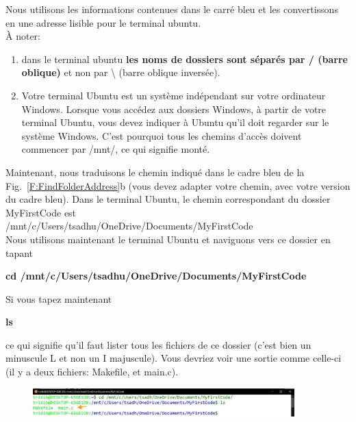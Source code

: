 \documentclass{article}
\newcommand\subfig[2]{{Fig.~\ref{#1}{#2}}}
\begin{document}
Nous utilisons les informations contenues dans le carré bleu et les convertissons en une adresse lisible pour le terminal ubuntu. \\
À noter:
\begin{enumerate}
\item dans le terminal ubuntu \textbf{les noms de dossiers sont séparés par / {\color{Bittersweet}(barre oblique)}} et non par \textbackslash{} (barre oblique inversée).
\item Votre terminal Ubuntu est un système indépendant sur votre ordinateur Windows. Lorsque vous accédez aux dossiers Windows, à partir de votre terminal Ubuntu, vous devez indiquer à Ubuntu qu'il doit regarder sur le système Windows. C'est pourquoi tous les chemins d'accès doivent commencer par /mnt/, ce qui signifie monté.
\end{enumerate}
Maintenant, nous traduisons le chemin indiqué dans le cadre bleu de la \subfig{F:FindFolderAddress}{b} (vous devez adapter votre chemin, avec votre version du cadre bleu). Dans le terminal Ubuntu, le chemin correspondant du dossier MyFirstCode est\\
/mnt/c/Users/tsadhu/OneDrive/Documents/MyFirstCode\\

Nous utilisons maintenant le terminal Ubuntu et naviguons vers ce dossier en tapant
\begin{tcolorbox}[width=\textwidth,colframe=BurntOrange,colback={black},title={ubuntu terminal},outer arc=0mm,colupper=white]  
    \large\textbf{  cd /mnt/c/Users/tsadhu/OneDrive/Documents/MyFirstCode }
\end{tcolorbox}
Si vous tapez maintenant 
\begin{tcolorbox}[width=\textwidth,colframe=BurntOrange,colback={black},title={ubuntu terminal},outer arc=0mm,colupper=white] 
      \large\textbf{ ls }
\end{tcolorbox}
ce qui signifie qu'il faut lister tous les fichiers de ce dossier (c'est bien un minuscule L et non un I majuscule). Vous devriez voir une sortie comme celle-ci (il y a deux fichiers: Makefile, et main.c).
\begin{figure}[H]
\center
\includegraphics[width=0.9\textwidth]{Plots/FirstCode_5.jpeg}
\end{figure}
\end{document}
